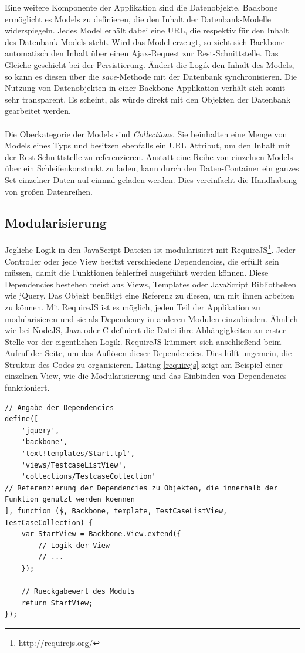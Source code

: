 Eine weitere Komponente der Applikation sind die Datenobjekte. Backbone ermöglicht es Models zu definieren, die den Inhalt der Datenbank-Modelle widerspiegeln. Jedes Model erhält dabei eine URL, die respektiv für den Inhalt des Datenbank-Models steht. Wird das Model erzeugt, so zieht sich Backbone automatisch den Inhalt über einen Ajax-Request zur Rest-Schnittstelle. Das Gleiche geschieht bei der Persistierung. Ändert die Logik den Inhalt des Models, so kann es diesen über die \textit{save}-Methode mit der Datenbank synchronisieren. Die Nutzung von Datenobjekten in einer Backbone-Applikation verhält sich somit sehr transparent. Es scheint, als würde direkt mit den Objekten der Datenbank gearbeitet werden.\\
\\
Die Oberkategorie der Models sind \textit{Collections}. Sie beinhalten eine Menge von Models eines Typs und besitzen ebenfalls ein URL Attribut, um den Inhalt mit der Rest-Schnittstelle zu referenzieren. Anstatt eine Reihe von einzelnen Models über ein Schleifenkonstrukt zu laden, kann durch den Daten-Container ein ganzes Set einzelner Daten auf einmal geladen werden. Dies vereinfacht die Handhabung von großen Datenreihen.

\subsection{Modularisierung}

Jegliche Logik in den JavaScript-Dateien ist modularisiert mit RequireJS\footnote{\url{http://requirejs.org/}}. Jeder Controller oder jede View besitzt verschiedene Dependencies, die erfüllt sein müssen, damit die Funktionen fehlerfrei ausgeführt werden können. Diese Dependencies bestehen meist aus Views, Templates oder JavaScript Bibliotheken wie jQuery. Das Objekt benötigt eine Referenz zu diesen, um mit ihnen arbeiten zu können. Mit RequireJS ist es möglich, jeden Teil der Applikation zu modularisieren und sie als Dependency in anderen Modulen einzubinden. Ähnlich wie bei NodeJS, Java oder C definiert die Datei ihre Abhängigkeiten an erster Stelle vor der eigentlichen Logik. RequireJS kümmert sich anschließend beim Aufruf der Seite, um das Auflösen dieser Dependencies. Dies hilft ungemein, die Struktur des Codes zu organisieren. Listing \ref{requirejs} zeigt am Beispiel einer einzelnen View, wie die Modularisierung und das Einbinden von Dependencies funktioniert.

\vspace{1cm}
\begin{lstlisting}[caption=Modularisierung mit RequireJS,label=requirejs]
// Angabe der Dependencies
define([
    'jquery',
    'backbone',
    'text!templates/Start.tpl',
    'views/TestcaseListView',
    'collections/TestcaseCollection'
// Referenzierung der Dependencies zu Objekten, die innerhalb der Funktion genutzt werden koennen
], function ($, Backbone, template, TestCaseListView, TestCaseCollection) {
    var StartView = Backbone.View.extend({
        // Logik der View
        // ...
    });

    // Rueckgabewert des Moduls
    return StartView;
});
\end{lstlisting}
\vspace{0.5cm}


